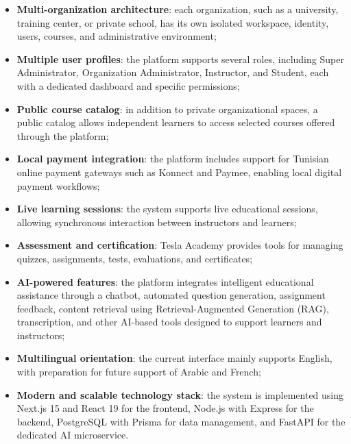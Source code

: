 \begin{itemize}
  \item \textbf{Multi-organization architecture}: each organization, such as a university,
        training center, or private school, has its own isolated workspace, identity,
        users, courses, and administrative environment;

  \item \textbf{Multiple user profiles}: the platform supports several roles, including
        Super Administrator, Organization Administrator, Instructor, and Student, each
        with a dedicated dashboard and specific permissions;

  \item \textbf{Public course catalog}: in addition to private organizational spaces, a
        public catalog allows independent learners to access selected courses offered
        through the platform;

  \item \textbf{Local payment integration}: the platform includes support for Tunisian
        online payment gateways such as Konnect and Paymee, enabling local digital
        payment workflows;

  \item \textbf{Live learning sessions}: the system supports live educational sessions,
        allowing synchronous interaction between instructors and learners;

  \item \textbf{Assessment and certification}: Tesla Academy provides tools for managing
        quizzes, assignments, tests, evaluations, and certificates;

  \item \textbf{AI-powered features}: the platform integrates intelligent educational
        assistance through a chatbot, automated question generation, assignment feedback,
        content retrieval using Retrieval-Augmented Generation (RAG), transcription, and
        other AI-based tools designed to support learners and instructors;

  \item \textbf{Multilingual orientation}: the current interface mainly supports English,
        with preparation for future support of Arabic and French;

  \item \textbf{Modern and scalable technology stack}: the system is implemented using
        Next.js 15 and React 19 for the frontend, Node.js with Express for the backend,
        PostgreSQL with Prisma for data management, and FastAPI for the dedicated AI
        microservice.
\end{itemize}

